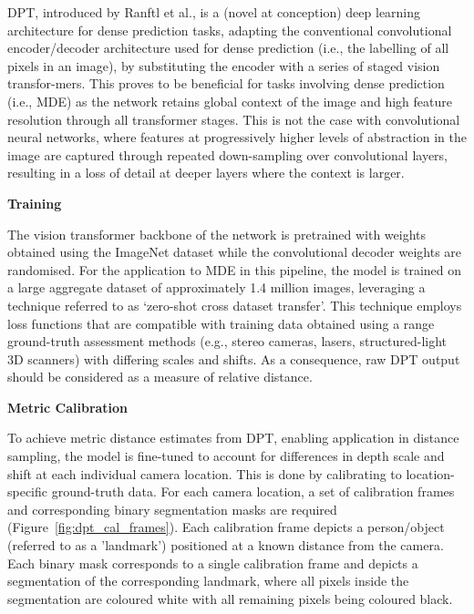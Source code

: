 DPT, introduced by Ranftl et al.\cite{dpt}, is a (novel at conception) deep learning architecture
for dense prediction tasks, adapting the conventional convolutional encoder/decoder architecture
used for dense prediction\cite{segmentation_CNN,invariant_CNNs}
(i.e., the labelling of all pixels in an image), by substituting the encoder with a series of staged
vision transfor-mers.\cite{vision_transformer,transformer}
This proves to be beneficial for tasks involving dense prediction (i.e., MDE) as the network retains
global context of the image and high feature resolution through all transformer stages.\cite{dpt,transformer}
This is not the case with convolutional neural networks, where features at progressively higher levels of
abstraction in the image are captured through repeated down-sampling over convolutional layers, resulting
in a loss of detail at deeper layers where the context is larger.\cite{dpt,invariance_in_CNNs}

\clearpage
\textbf{Training}

The vision transformer backbone of the network is pretrained with weights obtained using the ImageNet
dataset while the convolutional decoder weights are randomised.\cite{dpt,imagenet}
For the application to MDE in this pipeline, the model is trained on a large aggregate
dataset of approximately 1.4 million images, leveraging a technique referred to as `zero-shot
cross dataset transfer'.
This technique employs loss functions that are compatible with training data obtained using a range
ground-truth assessment methods (e.g., stereo cameras, lasers, structured-light 3D scanners) with
differing scales and shifts.
As a consequence, raw DPT output should be considered as a measure of relative distance.\cite{dpt,dpt_training}

\vspace{5mm}
\textbf{Metric Calibration}

To achieve metric distance estimates from DPT, enabling application in distance sampling,
the model is fine-tuned to account for differences in depth scale and shift at each individual
camera location.
This is done by calibrating to location-specific ground-truth data.
For each camera location, a set of calibration frames and corresponding binary segmentation masks
are required (Figure~\ref{fig:dpt_cal_frames}).
Each calibration frame depicts a person/object (referred to as a 'landmark') positioned at a
known distance from the camera.
Each binary mask corresponds to a single calibration frame and depicts a segmentation of the
corresponding landmark, where all pixels inside the segmentation are coloured white with all
remaining pixels being coloured black.\cite{HAUCKE2022101536}

